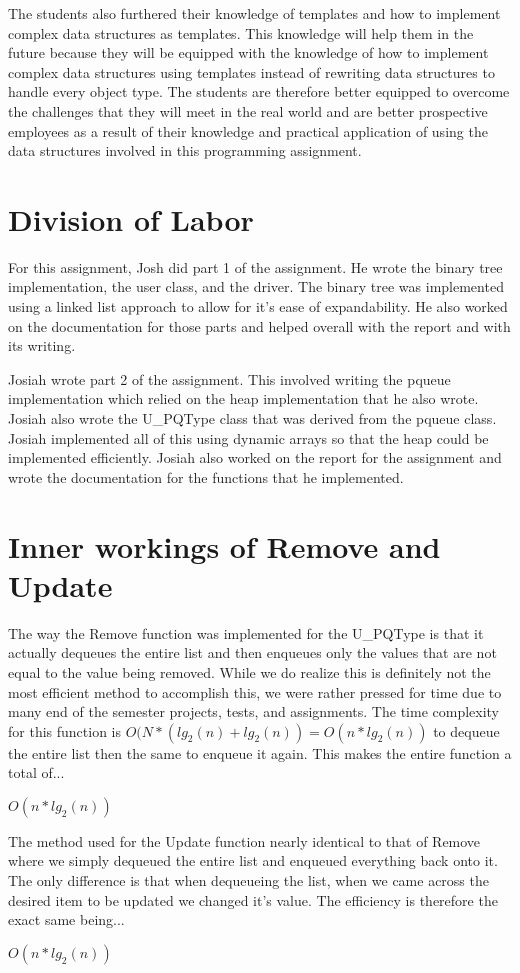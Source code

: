\documentclass[pdftex, 12pt]{article}
\begin{document}
The students also furthered their knowledge of templates and how to implement complex data structures as templates. This
knowledge will help them in the future because they will be equipped with the knowledge of how to implement complex data
structures using templates instead of rewriting data structures to handle every object type. The students are therefore
better equipped to overcome the challenges that they will meet in the real world and are better prospective employees as
a result of their knowledge and practical application of using the data structures involved in this programming
assignment.

\section{Division of Labor}

For this assignment, Josh did part 1 of the assignment. He wrote the binary tree implementation, the user class, and the
driver. The binary tree was implemented using a linked list approach to allow for it's ease of expandability. He also
worked on the documentation for those parts and helped overall with the report and with its writing.

Josiah wrote part 2 of the assignment. This involved writing the pqueue implementation which relied on the heap
implementation that he also wrote. Josiah also wrote the U\_PQType class that was derived from the pqueue class. Josiah
implemented all of this using dynamic arrays so that the heap could be implemented efficiently. Josiah also worked on
the report for the assignment and wrote the documentation for the functions that he implemented. 

\section{Inner workings of Remove and Update}

The way the Remove function was implemented for the U\_PQType is that it actually dequeues the entire list and then
enqueues only the values that are not equal to the value being removed.  While we do realize this is definitely not the
most efficient method to accomplish this, we were rather pressed for time due to many end of the semester projects,
tests, and assignments.  The time complexity for this function is $O(N*(lg_2(n)+lg_2(n))=O(n*lg_2(n))$ to dequeue the entire
list then the same to enqueue it again. This makes the entire function a total of...

$O(n*lg_2(n))$

The method used for the Update function nearly identical to that of Remove where we simply dequeued the entire list and
enqueued everything back onto it.  The only difference is that when dequeueing the list, when we came across the desired
item to be updated we changed it's value.  The efficiency is therefore the exact same being...

$O(n*lg_2(n))$
\end{document}
